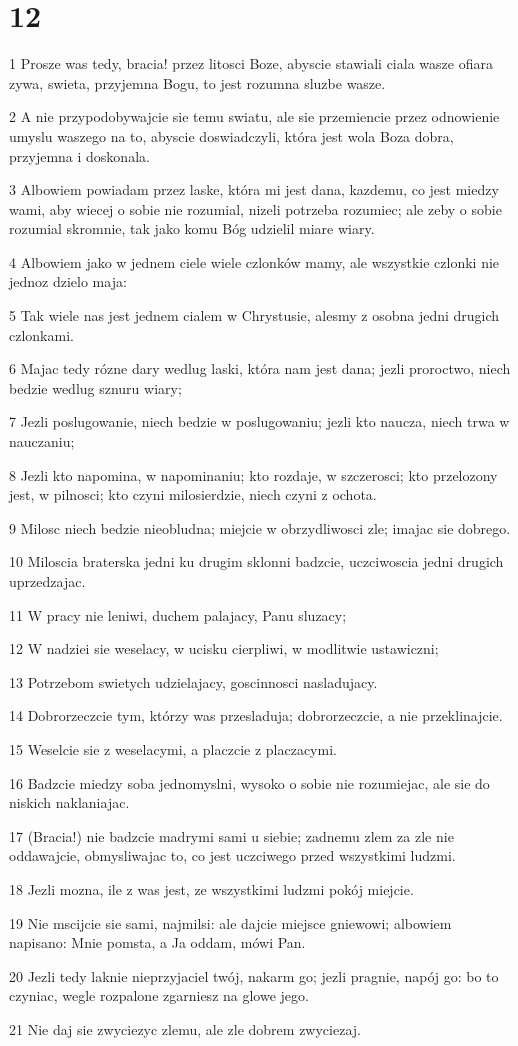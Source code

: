 \chapter{12}

\par 1 Prosze was tedy, bracia! przez litosci Boze, abyscie stawiali ciala wasze ofiara zywa, swieta, przyjemna Bogu, to jest rozumna sluzbe wasze.
\par 2 A nie przypodobywajcie sie temu swiatu, ale sie przemiencie przez odnowienie umyslu waszego na to, abyscie doswiadczyli, która jest wola Boza dobra, przyjemna i doskonala.
\par 3 Albowiem powiadam przez laske, która mi jest dana, kazdemu, co jest miedzy wami, aby wiecej o sobie nie rozumial, nizeli potrzeba rozumiec; ale zeby o sobie rozumial skromnie, tak jako komu Bóg udzielil miare wiary.
\par 4 Albowiem jako w jednem ciele wiele czlonków mamy, ale wszystkie czlonki nie jednoz dzielo maja:
\par 5 Tak wiele nas jest jednem cialem w Chrystusie, alesmy z osobna jedni drugich czlonkami.
\par 6 Majac tedy rózne dary wedlug laski, która nam jest dana; jezli proroctwo, niech bedzie wedlug sznuru wiary;
\par 7 Jezli poslugowanie, niech bedzie w poslugowaniu; jezli kto naucza, niech trwa w nauczaniu;
\par 8 Jezli kto napomina, w napominaniu; kto rozdaje, w szczerosci; kto przelozony jest, w pilnosci; kto czyni milosierdzie, niech czyni z ochota.
\par 9 Milosc niech bedzie nieobludna; miejcie w obrzydliwosci zle; imajac sie dobrego.
\par 10 Miloscia braterska jedni ku drugim sklonni badzcie, uczciwoscia jedni drugich uprzedzajac.
\par 11 W pracy nie leniwi, duchem palajacy, Panu sluzacy;
\par 12 W nadziei sie weselacy, w ucisku cierpliwi, w modlitwie ustawiczni;
\par 13 Potrzebom swietych udzielajacy, goscinnosci nasladujacy.
\par 14 Dobrorzeczcie tym, którzy was przesladuja; dobrorzeczcie, a nie przeklinajcie.
\par 15 Weselcie sie z weselacymi, a placzcie z placzacymi.
\par 16 Badzcie miedzy soba jednomyslni, wysoko o sobie nie rozumiejac, ale sie do niskich naklaniajac.
\par 17 (Bracia!) nie badzcie madrymi sami u siebie; zadnemu zlem za zle nie oddawajcie, obmysliwajac to, co jest uczciwego przed wszystkimi ludzmi.
\par 18 Jezli mozna, ile z was jest, ze wszystkimi ludzmi pokój miejcie.
\par 19 Nie mscijcie sie sami, najmilsi: ale dajcie miejsce gniewowi; albowiem napisano: Mnie pomsta, a Ja oddam, mówi Pan.
\par 20 Jezli tedy laknie nieprzyjaciel twój, nakarm go; jezli pragnie, napój go: bo to czyniac, wegle rozpalone zgarniesz na glowe jego.
\par 21 Nie daj sie zwyciezyc zlemu, ale zle dobrem zwyciezaj.


